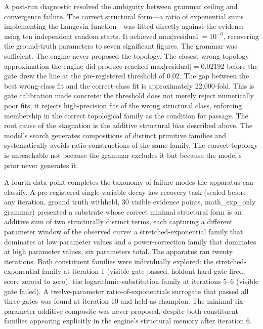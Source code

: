 \documentclass[11pt]{article}
\begin{document}
A post-run diagnostic resolved the ambiguity between grammar ceiling and convergence failure. The correct structural form---a ratio of exponential sums implementing the Langevin function---was fitted directly against the evidence using ten independent random starts. It achieved max$|$residual$| = 10^{-6}$, recovering the ground-truth parameters to seven significant figures. The grammar was sufficient. The engine never proposed the topology. The closest wrong-topology approximation the engine did produce reached max$|$residual$| = 0.02192$ before the gate drew the line at the pre-registered threshold of $0.02$. The gap between the best wrong-class fit and the correct-class fit is approximately 22{,}000-fold. This is gate calibration made concrete: the threshold does not merely reject numerically poor fits; it rejects high-precision fits of the wrong structural class, enforcing membership in the correct topological family as the condition for passage. The root cause of the stagnation is the additive structural bias described above. The model's search generates compositions of distinct primitive families and systematically avoids ratio constructions of the same family. The correct topology is unreachable not because the grammar excludes it but because the model's prior never generates it.

A fourth data point completes the taxonomy of failure modes the apparatus can classify. A pre-registered single-variable decay law recovery task (sealed before any iteration, ground truth withheld, 30 visible evidence points, math\_exp\_only grammar) presented a substrate whose correct minimal structural form is an additive sum of two structurally distinct terms, each capturing a different parameter window of the observed curve: a stretched-exponential family that dominates at low parameter values and a power-correction family that dominates at high parameter values, six parameters total. The apparatus ran twenty iterations. Both constituent families were individually explored: the stretched-exponential family at iteration 1 (visible gate passed, holdout hard-gate fired, score zeroed to zero); the logarithmic-substitution family at iterations 5--6 (visible gate failed). A twelve-parameter ratio-of-exponentials surrogate that passed all three gates was found at iteration 10 and held as champion. The minimal six-parameter additive composite was never proposed, despite both constituent families appearing explicitly in the engine's structural memory after iteration 6.
\end{document}
